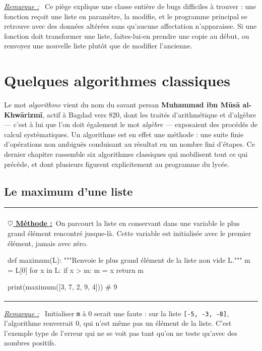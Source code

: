\documentclass[a4paper,11pt,openany]{book}
\makeatletter
\newcommand{\code}[1]{\texttt{\textcolor{codebleu}{#1}}}
\newenvironment{cadre}%
 {\par\vspace{2mm}\noindent\begin{tabular}{|@{\hspace{4mm}}p{0.93\textwidth}@{\hspace{4mm}}|}
  \hline \\[-2mm]}%
 {\\[2mm] \hline \end{tabular}\par\vspace{3mm}}
\newcommand{\methode}{\textbf{\underline{$\heartsuit$ Méthode :}}~}
\newenvironment{remarque}%
 {\par\vspace{1mm}\begin{list}{}{\leftmargin=1cm \rightmargin=0.5cm}\item[]%
  \textit{\underline{Remarque :}}~}%
 {\end{list}\vspace{1mm}}
\makeatother
\begin{document}
\begin{remarque}
Ce piège explique une classe entière de bugs difficiles à trouver : une fonction reçoit une liste en paramètre, la modifie, et le programme principal se retrouve avec des données altérées sans qu'aucune affectation n'apparaisse. Si une fonction doit transformer une liste, faites-lui-en prendre une copie au début, ou renvoyez une nouvelle liste plutôt que de modifier l'ancienne.
\end{remarque}
\chapter{Quelques algorithmes classiques}

Le mot \emph{algorithme} vient du nom du savant persan \textbf{Muhammad ibn Mūsā al-Khwārizmī}, actif à Bagdad vers 820, dont les traités d'arithmétique et d'algèbre — c'est à lui que l'on doit également le mot \emph{algèbre} — exposaient des procédés de calcul systématiques. Un algorithme est en effet une méthode : une suite finie d'opérations non ambiguës conduisant au résultat en un nombre fini d'étapes. Ce dernier chapitre rassemble six algorithmes classiques qui mobilisent tout ce qui précède, et dont plusieurs figurent explicitement au programme du lycée.

\section{Le maximum d'une liste}

\begin{cadre}
\methode On parcourt la liste en conservant dans une variable le plus grand élément rencontré jusque-là. Cette variable est initialisée avec le premier élément, jamais avec zéro.
\begin{python}
def maximum(L):
    """Renvoie le plus grand élément de la liste non vide L."""
    m = L[0]
    for x in L:
        if x > m:
            m = x
    return m

print(maximum([3, 7, 2, 9, 4]))     # 9
\end{python}
\end{cadre}

\begin{remarque}
Initialiser \code{m} à $0$ serait une faute : sur la liste \code{[-5, -3, -8]}, l'algorithme renverrait $0$, qui n'est même pas un élément de la liste. C'est l'exemple type de l'erreur qui ne se voit pas tant qu'on ne teste qu'avec des nombres positifs.
\end{remarque}
\end{document}
